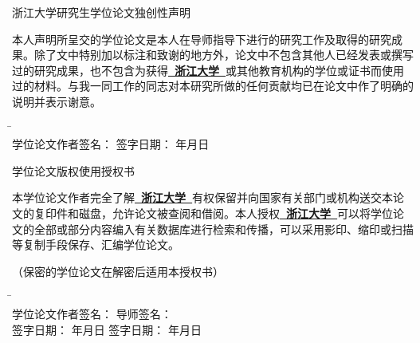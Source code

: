 
\newpage
\thispagestyle{empty}

{\songti
\begin{center}
\xiaoer 浙江大学研究生学位论文独创性声明
\end{center}

\vspace{5mm}

本人声明所呈交的学位论文是本人在导师指导下进行的研究工作及取得的研究成果。除了文中特别加以标注和致谢的地方外，论文中不包含其他人已经发表或撰写过的研究成果，也不包含为获得\underline{\kaiti\bfseries\sihao~浙江大学~}或其他教育机构的学位或证书而使用过的材料。与我一同工作的同志对本研究所做的任何贡献均已在论文中作了明确的说明并表示谢意。

\begin{tabbing}
\hspace{0.5\linewidth} \= \hspace{0.5\linewidth} \kill \\
学位论文作者签名： \> 签字日期： \quad\quad\quad 年\quad\quad 月\quad\quad 日
\end{tabbing}

\vspace{20mm}

\begin{center}
\xiaoer 学位论文版权使用授权书
\end{center}

\vspace{5mm}

本学位论文作者完全了解\underline{\kaiti\bfseries\sihao~浙江大学~}有权保留并向国家有关部门或机构送交本论文的复印件和磁盘，允许论文被查阅和借阅。本人授权\underline{\kaiti\bfseries\sihao~浙江大学~}可以将学位论文的全部或部分内容编入有关数据库进行检索和传播，可以采用影印、缩印或扫描等复制手段保存、汇编学位论文。

（保密的学位论文在解密后适用本授权书）

\begin{tabbing}
\hspace{0.5\linewidth} \= \hspace{0.5\linewidth} \kill \\
学位论文作者签名： \> 导师签名： \\[5mm]
签字日期： \quad\quad\quad 年\quad\quad 月\quad\quad 日 \> 签字日期： \quad\quad\quad 年\quad\quad 月\quad\quad 日
\end{tabbing}
}

